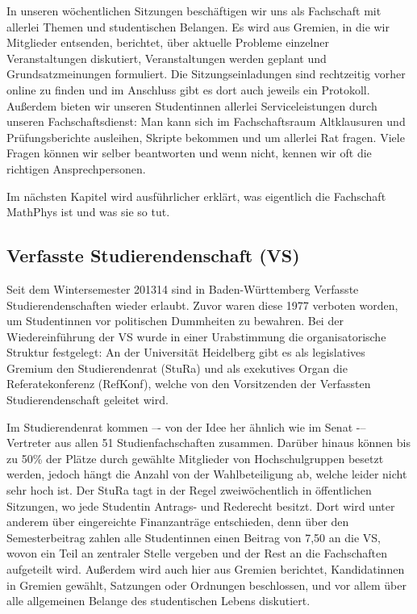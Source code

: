In unseren wöchentlichen Sitzungen beschäftigen wir uns als Fachschaft mit allerlei Themen und studentischen Belangen. 
Es wird aus Gremien, in die wir Mitglieder entsenden, berichtet, über aktuelle Probleme einzelner Veranstaltungen diskutiert, Veranstaltungen werden geplant und Grundsatzmeinungen formuliert. Die Sitzungseinladungen sind rechtzeitig vorher online zu finden und im Anschluss gibt es dort auch jeweils ein Protokoll. Außerdem bieten wir unseren Studentinnen allerlei Serviceleistungen durch unseren Fachschaftsdienst: Man kann sich im Fachschaftsraum Altklausuren und Prüfungsberichte ausleihen, Skripte bekommen und um allerlei Rat fragen. Viele Fragen können wir selber beantworten und wenn nicht, kennen wir oft die richtigen Ansprechpersonen.

Im nächsten Kapitel wird ausführlicher erklärt, was eigentlich die Fachschaft MathPhys ist und was sie so tut.

\subsection{Verfasste Studierendenschaft (VS)}
Seit dem Wintersemester 2013\/14 sind in Baden-Württemberg Verfasste Studierendenschaften wieder erlaubt. 
Zuvor waren diese 1977 verboten worden, um Studentinnen vor politischen Dummheiten zu bewahren. 
Bei der Wiedereinführung der VS wurde in einer Urabstimmung die organisatorische Struktur festgelegt: 
An der Universität Heidelberg gibt es als legislatives Gremium den Studierendenrat (StuRa) und als exekutives Organ die Referatekonferenz (RefKonf), welche von den Vorsitzenden der Verfassten Studierendenschaft geleitet wird.

Im Studierendenrat kommen –- von der Idee her ähnlich wie im Senat -– Vertreter aus allen 51 Studienfachschaften zusammen. 
Darüber hinaus können bis zu 50\% der Plätze durch gewählte Mitglieder von Hochschulgruppen besetzt werden, jedoch hängt die Anzahl von der Wahlbeteiligung ab, welche leider nicht sehr hoch ist. 
Der StuRa tagt in der Regel zweiwöchentlich in öffentlichen Sitzungen, wo jede Studentin Antrags- und Rederecht besitzt. 
Dort wird unter anderem über eingereichte Finanzanträge entschieden, denn über den Semesterbeitrag zahlen alle Studentinnen einen Beitrag von 7,50 \EUR an die VS, wovon ein Teil an zentraler Stelle vergeben und der Rest an die Fachschaften aufgeteilt wird. 
Außerdem wird auch hier aus Gremien berichtet, Kandidatinnen in Gremien gewählt, Satzungen oder Ordnungen beschlossen, und vor allem über alle allgemeinen Belange des studentischen Lebens diskutiert.

